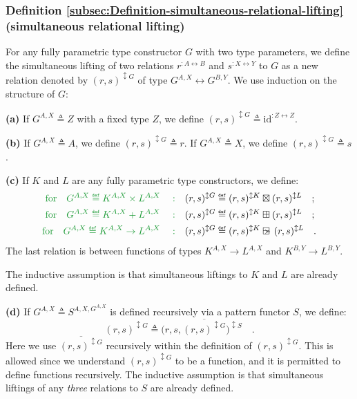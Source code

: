 \subsubsection{Definition \label{subsec:Definition-simultaneous-relational-lifting}\ref{subsec:Definition-simultaneous-relational-lifting}
(simultaneous relational lifting)}

For any fully parametric type constructor $G$ with two type parameters,
we define the simultaneous lifting of two relations $r^{:A\leftrightarrow B}$
and $s^{:X\leftrightarrow Y}$ to $G$ as a new relation denoted by
$(r,s)^{\updownarrow G}$ of type $G^{A,X}\leftrightarrow G^{B,Y}$.
We use induction on the structure of $G$:

\textbf{(a)} If $G^{A,X}\triangleq Z$ with a fixed type $Z$, we
define $(r,s)^{\updownarrow G}\triangleq\text{id}^{:Z\leftrightarrow Z}$.

\textbf{(b)} If $G^{A,X}\triangleq A$, we define $(r,s)^{\updownarrow G}\triangleq r$.
If $G^{A,X}\triangleq X$, we define $(r,s)^{\updownarrow G}\triangleq s$.

\textbf{(c)} If $K$ and $L$ are any fully parametric type constructors,
we define: 
\begin{align*}
{\color{greenunder}\text{for}\quad G^{A,X}\triangleq K^{A,X}\times L^{A,X}\quad:}\quad & (r,s)^{\updownarrow G}\triangleq(r,s)^{\updownarrow K}\boxtimes(r,s)^{\updownarrow L}\quad;\\
{\color{greenunder}\text{for}\quad G^{A,X}\triangleq K^{A,X}+L^{A,X}\quad:}\quad & (r,s)^{\updownarrow G}\triangleq(r,s)^{\updownarrow K}\boxplus(r,s)^{\updownarrow L}\quad;\\
{\color{greenunder}\text{for}\quad G^{A,X}\triangleq K^{A,X}\rightarrow L^{A,X}\quad:}\quad & (r,s)^{\updownarrow G}\triangleq(r,s)^{\updownarrow K}\ogreaterthan(r,s)^{\updownarrow L}\quad.
\end{align*}
The last relation is between functions of types $K^{A,X}\rightarrow L^{A,X}$
and $K^{B,Y}\rightarrow L^{B,Y}$. 

The inductive assumption is that simultaneous liftings to $K$ and
$L$ are already defined.

\textbf{(d)} If $G^{A,X}\triangleq S^{A,X,G^{A,X}}$ is defined recursively
via a pattern functor $S$, we define:
\[
(r,s)^{\updownarrow G}\triangleq\big(r,s,\overline{(r,s)^{\updownarrow G}}\big)^{\updownarrow S}\quad.
\]
Here we use $\overline{(r,s)^{\updownarrow G}}$ recursively within
the definition of $(r,s)^{\updownarrow G}$. This is allowed since
we understand $(r,s)^{\updownarrow G}$ to be a function, and it is
permitted to define functions recursively. The inductive assumption
is that simultaneous liftings of any \emph{three} relations to $S$
are already defined. 

